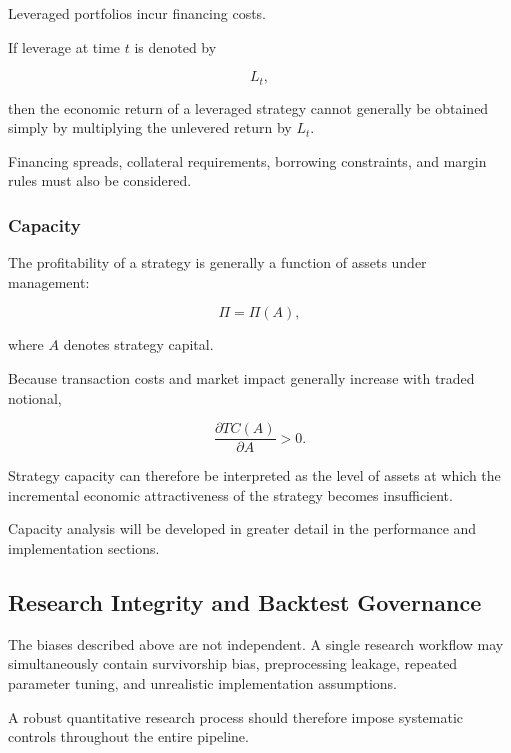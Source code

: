 \documentclass[11pt,a4paper]{article}
\begin{document}
Leveraged portfolios incur financing costs.

If leverage at time $t$ is denoted by

\begin{equation}
L_t,
\end{equation}

then the economic return of a leveraged strategy cannot generally be obtained
simply by multiplying the unlevered return by $L_t$.

Financing spreads, collateral requirements, borrowing constraints, and margin
rules must also be considered.


\subsubsection{Capacity}

The profitability of a strategy is generally a function of assets under
management:

\begin{equation}
\Pi
=
\Pi(A),
\end{equation}

where $A$ denotes strategy capital.

Because transaction costs and market impact generally increase with traded
notional,

\begin{equation}
\frac{\partial TC(A)}{\partial A}
>
0.
\end{equation}

Strategy capacity can therefore be interpreted as the level of assets at which
the incremental economic attractiveness of the strategy becomes insufficient.

Capacity analysis will be developed in greater detail in the performance and
implementation sections.


\subsection{Research Integrity and Backtest Governance}
\label{subsec:research_integrity}

The biases described above are not independent. A single research workflow may
simultaneously contain survivorship bias, preprocessing leakage, repeated
parameter tuning, and unrealistic implementation assumptions.

A robust quantitative research process should therefore impose systematic
controls throughout the entire pipeline.
\end{document}

